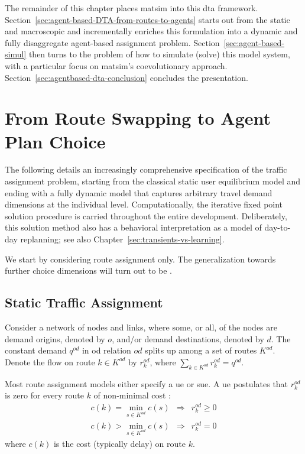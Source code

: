 The remainder of this chapter places \gls{matsim} into this \gls{dta} framework.
Section~\ref{sec:agent-based-DTA-from-routes-to-agents} starts out from the
static and macroscopic 
and incrementally enriches this formulation into a dynamic and fully disaggregate agent-based assignment problem.
Section~\ref{sec:agent-based-simul} then turns to the problem of how to
simulate (solve) this model system, with a particular focus on \gls{matsim}'s
coevolutionary approach. Section~\ref{sec:agentbased-dta-conclusion} concludes
the presentation.


\section{\label{sec:agent-based-DTA-from-routes-to-agents}From Route Swapping to Agent Plan Choice}

The following details an increasingly comprehensive specification of the traffic 
assignment problem, starting from the classical static user 
equilibrium model and ending with a fully dynamic model that captures 
arbitrary travel demand dimensions at the individual level. Computationally, 
the iterative fixed point solution procedure is carried throughout the 
entire development. Deliberately, this solution method also has a behavioral 
interpretation as a model of day-to-day replanning; see also Chapter~\ref{sec:transients-vs-learning}.

We start by considering route assignment only. The generalization towards further 
choice dimensions will 
turn out to be .

\subsection{\label{static-macro-assignment}Static Traffic Assignment}

Consider a network of nodes and links, where some, or all, of the nodes are demand origins, 
denoted by $o$, and/or demand destinations, denoted by $d$. 
The constant demand $q^{od}$ in  \gls{od} relation $od$ splits up
among a set of routes $K^{od}$.
Denote the flow on route $k\in K^{od}$ by $r^{od}_k$, where $\sum_{k\in K^{od}} r^{od}_k = q^{od}$.

Most route assignment models either specify a \gls{ue} 
or  \gls{sue}.  
A \gls{ue} postulates that $r^{od}_k$ is zero for every route $k$ of non-minimal cost \citep{Wardrop_PICE_1952}:
\begin{eqnarray}
c(k)=\min_{s\in K^{od}}c(s) & \Rightarrow & r^{od}_{k}\geq0\\
c(k)>\min_{s\in K^{od}}c(s) & \Rightarrow & r^{od}_{k}=0
\end{eqnarray}
where $c(k)$ is the cost (typically delay) on route $k$.
 
